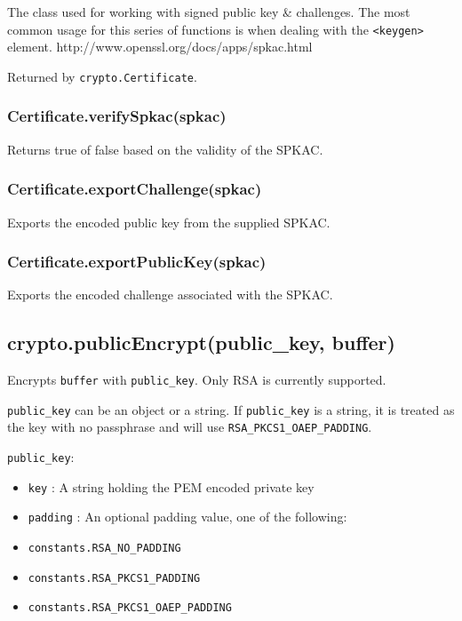 The class used for working with signed public key \& challenges. The
most common usage for this series of functions is when dealing with the
\texttt{\textless{}keygen\textgreater{}} element.
http://www.openssl.org/docs/apps/spkac.html

Returned by \texttt{crypto.Certificate}.

\subsubsection{Certificate.verifySpkac(spkac)}\label{certificate.verifyspkacspkac}

Returns true of false based on the validity of the SPKAC.

\subsubsection{Certificate.exportChallenge(spkac)}\label{certificate.exportchallengespkac}

Exports the encoded public key from the supplied SPKAC.

\subsubsection{Certificate.exportPublicKey(spkac)}\label{certificate.exportpublickeyspkac}

Exports the encoded challenge associated with the SPKAC.

\subsection{crypto.publicEncrypt(public\_key,
buffer)}\label{crypto.publicencryptpublicux5fkey-buffer}

Encrypts \texttt{buffer} with \texttt{public\_key}. Only RSA is
currently supported.

\texttt{public\_key} can be an object or a string. If
\texttt{public\_key} is a string, it is treated as the key with no
passphrase and will use \texttt{RSA\_PKCS1\_OAEP\_PADDING}.

\texttt{public\_key}:

\begin{itemize}
\itemsep1pt\parskip0pt
\item
  \texttt{key} : A string holding the PEM encoded private key
\item
  \texttt{padding} : An optional padding value, one of the following:
\item
  \texttt{constants.RSA\_NO\_PADDING}
\item
  \texttt{constants.RSA\_PKCS1\_PADDING}
\item
  \texttt{constants.RSA\_PKCS1\_OAEP\_PADDING}
\end{itemize}


